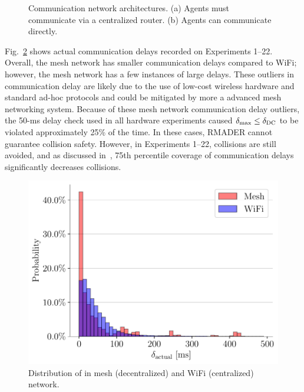 \begin{figure}[h]
{
    }
    \caption[Communication network architectures]{Communication network architectures. (a) Agents must communicate via a centralized router. (b) Agents can communicate directly.}
    \label{fig:network}
\end{figure}

Fig.~\ref{fig:comm_delay_on_mesh_centr} shows actual communication delays recorded on Experiments 1--22.
Overall, the mesh network has smaller communication delays compared to WiFi; however, the mesh network has a few instances of large delays.
These outliers in communication delay are likely due to the use of low-cost wireless hardware and standard ad-hoc protocols and could be mitigated by more a advanced mesh networking system.
Because of these mesh network communication delay outliers, the 50-ms delay check used in all hardware experiments caused $\delta_\text{max}{}\le\delta_\text{DC}{}$ to be violated approximately 25\% of the time.
In these cases, RMADER cannot guarantee collision safety.
However, in Experiments 1--22, collisions are still avoided, and as discussed in~\cite{kondo2022robust}, 75th percentile coverage of communication delays significantly decreases collisions.

\begin{figure}
    \centering
    \includegraphics[width=0.7\columnwidth]{figures/mesh_centr_comm_delay.pdf} 
    \setlength{\belowcaptionskip}{-0.5em}
    \caption{Distribution of \delayActual{} in mesh (decentralized) and WiFi (centralized) network.}
    \label{fig:comm_delay_on_mesh_centr}
\end{figure}

